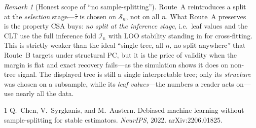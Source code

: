 \documentclass[11pt]{article}
\theoremstyle{plain}
\theoremstyle{definition}
\theoremstyle{remark}
\newtheorem*{remark}{Remark}
\begin{document}
\begin{remark}[Honest scope of ``no sample-splitting'']
Route~A reintroduces a split at the \emph{selection} stage---$\hat\tau$ is chosen
on $\mathcal S_n$, not on all $n$. What Route~A preserves is the property CSA
buys: \emph{no split at the inference stage}, i.e.\ leaf values and the CLT use
the full inference fold $\mathcal I_n$ with LOO stability standing in for
cross-fitting. This is strictly weaker than the ideal ``single tree, all $n$,
no split anywhere'' that Route~B targets under structural PC, but it is the price
of validity when the margin is flat and exact recovery fails---as the simulation
shows it does on non-tree signal. The displayed tree is still a single
interpretable tree; only its \emph{structure} was chosen on a subsample, while its
\emph{leaf values}---the numbers a reader acts on---use nearly all the data.
\end{remark}


\begin{thebibliography}{1}
Q.~Chen, V.~Syrgkanis, and M.~Austern.
\newblock Debiased machine learning without sample-splitting for stable
  estimators.
\newblock \emph{NeurIPS}, 2022. arXiv:2206.01825.
\end{thebibliography}
\end{document}
